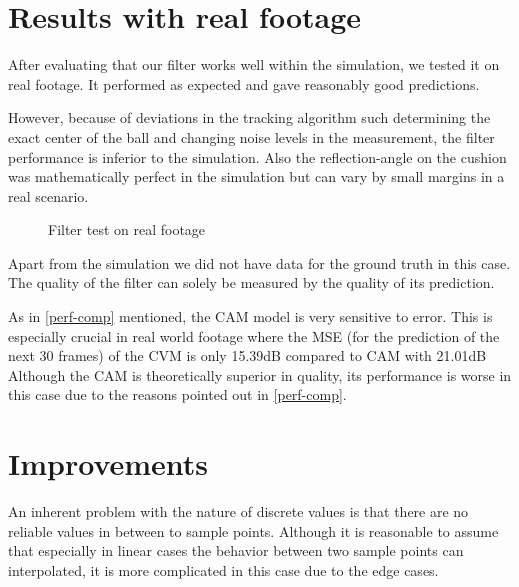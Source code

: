 \documentclass[notitlepage, a4paper, 11pt]{scrartcl}
\begin{document}
\begin{multicols}{2}
\section{Results with real footage}

After evaluating that our filter works well within the simulation, we tested it on real footage. 
It performed as expected and gave reasonably good predictions.

However, because of deviations in the tracking algorithm such determining the exact center of the ball and changing noise levels in the measurement, 
the filter performance is inferior to the simulation. Also the reflection-angle on the cushion was mathematically perfect in the simulation
but can vary by small margins in a real scenario.

\begin{figure}[H]
    \centering
    \caption{Filter test on real footage}
    \label{fig:realfootage}
\end{figure}

Apart from the simulation we did not have data for the ground truth in this case. 
The quality of the filter can solely be measured by the quality of its prediction. 

As in \cref{perf-comp} mentioned, the CAM model is very sensitive to error. This is especially crucial in real world footage where the MSE (for the prediction of the next 30 frames) of the CVM is only 15.39dB compared to CAM with 21.01dB
Although the CAM is theoretically superior in quality, its performance is worse in this case due to the reasons pointed out in \cref{perf-comp}.

\section{Improvements}

An inherent problem with the nature of discrete values is that there are no reliable values in between to sample points. 
Although it is reasonable to assume that especially in linear cases the behavior between two sample points can interpolated, 
it is more complicated in this case due to the edge cases.


\end{multicols}
\end{document}
